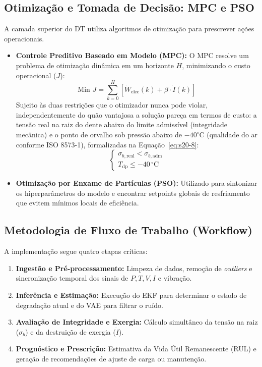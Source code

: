 \documentclass[12pt,a4paper]{article}
\numberwithin{equation}{section}
\numberwithin{table}{section}
\numberwithin{figure}{section}
\begin{document}
	\subsection{Otimização e Tomada de Decisão: MPC e PSO}
	
	A camada superior do DT utiliza algoritmos de otimização para prescrever ações operacionais.
	
	\begin{itemize}
		\item \textbf{Controle Preditivo Baseado em Modelo (MPC):}
		O MPC resolve um problema de otimização dinâmica em um horizonte $H$, minimizando o custo operacional ($J$):
		\begin{equation}\label{eq:s20-7}
 \text{Min } J = \sum_{k=0}^{H} \left[ \dot{W}_{\text{elec}}(k) + \beta \cdotp \dot{I}(k) \right] 
\end{equation}
		Sujeito às duas restrições que o otimizador nunca pode violar, independentemente do quão vantajosa a solução pareça em termos de custo: a tensão real na raiz do dente abaixo do limite admissível (integridade mecânica) e o ponto de orvalho sob pressão abaixo de $-40^{\circ}$C (qualidade do ar conforme ISO 8573-1), formalizadas na Equação~\eqref{eq:s20-8}:
		\begin{equation}\label{eq:s20-8}
 \begin{cases} \sigma_{b,\text{real}} < \sigma_{b,\text{adm}} \\ T_{\text{dp}} \le -40\,^{\circ}\text{C} \end{cases}
\end{equation}
		
		\item \textbf{Otimização por Enxame de Partículas (PSO):}
		Utilizado para sintonizar os hiperparâmetros do modelo e encontrar setpoints globais de resfriamento que evitem mínimos locais de eficiência.
	\end{itemize}
	
	\subsection{Metodologia de Fluxo de Trabalho (Workflow)}
	
	A implementação segue quatro etapas críticas:
	\begin{enumerate}
		\item \textbf{Ingestão e Pré-processamento:} Limpeza de dados, remoção de \textit{outliers} e sincronização temporal dos sinais de $P, T, V, I$ e vibração.
		\item \textbf{Inferência e Estimação:} Execução do EKF para determinar o estado de degradação atual e do VAE para filtrar o ruído.
		\item \textbf{Avaliação de Integridade e Exergia:} Cálculo simultâneo da tensão na raiz ($\sigma_b$) e da destruição de exergia ($\dot{I}$).
		\item \textbf{Prognóstico e Prescrição:} Estimativa da Vida Útil Remanescente (RUL) e geração de recomendações de ajuste de carga ou manutenção.
	\end{enumerate}
	
\end{document}
